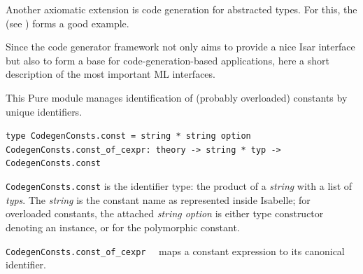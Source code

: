 \begin{isabellebody}
\begin{isamarkuptext}
  \medskip

  Another axiomatic extension is code generation
  for abstracted types.  For this, the  
   (see )
  forms a good example.%
\end{isamarkuptext}%
\isamarkuptrue%
%
\isamarkuptrue%
%
\begin{isamarkuptext}%
Since the code generator framework not only aims to provide
  a nice Isar interface but also to form a base for
  code-generation-based applications, here a short
  description of the most important ML interfaces.%
\end{isamarkuptext}%
\isamarkuptrue%
%
\isamarkuptrue%
%
\begin{isamarkuptext}%
This Pure module manages identification of (probably overloaded)
  constants by unique identifiers.%
\end{isamarkuptext}%
\isamarkuptrue%
%
\isadelimmlref
%
\endisadelimmlref
%
\isatagmlref
%
\begin{isamarkuptext}%
\begin{mldecls}
  \verb|type CodegenConsts.const = string * string option| \\
  \verb|CodegenConsts.const_of_cexpr: theory -> string * typ -> CodegenConsts.const| \\
 \end{mldecls}

  \begin{description}

  \item \verb|CodegenConsts.const| is the identifier type:
     the product of a \emph{string} with a list of \emph{typs}.
     The \emph{string} is the constant name as represented inside Isabelle;
     for overloaded constants, the attached \emph{string option}
     is either  type constructor denoting an instance,
     or  for the polymorphic constant.

  \item \verb|CodegenConsts.const_of_cexpr|~~
     maps a constant expression 
     to its canonical identifier.


\end{description}
\end{isamarkuptext}
\end{isabellebody}
